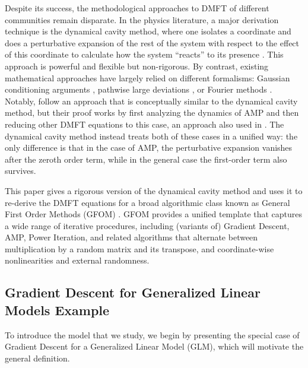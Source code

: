 \documentclass{article}
\newcommand{\1}{\mathbbm{1}}
\theoremstyle{plain}
\theoremstyle{definition}
\theoremstyle{remark}
\begin{document}
Despite its success, the methodological approaches to DMFT of different communities remain disparate. In the physics literature, a major derivation technique is the dynamical cavity method, where one isolates a coordinate and does a perturbative expansion of the rest of the system with respect to the effect of this coordinate to calculate how the system ``reacts'' to its presence \cite{mezard1987spin}. This approach is powerful and flexible but non-rigorous. By contrast, existing mathematical approaches have largely relied on different formalisms: Gaussian conditioning arguments \cite{bolthausen2014iterative, bayati2011dynamics, celentano2020estimation, celentano2021high, gerbelot2024rigorous}, pathwise large deviations \cite{arous1995large, arous1997symmetric, guionnet1997averaged, ben2006cugliandolo, grunwald1996sanov}, or Fourier methods \cite{bayati2015universality, jones2024fourier}. Notably, \cite{bao2025leave, han2025entrywise} follow an approach that is conceptually similar to the dynamical cavity method, but their proof works by first analyzing the dynamics of AMP and then reducing other DMFT equations to this case, an approach also used in \cite{celentano2020estimation, celentano2021high, dudeja2024spectral}. The dynamical cavity method instead
treats both of these cases in a unified way: the only difference is that in the case of AMP, the perturbative expansion vanishes after the zeroth order term, while in the general case the first-order term also survives.


This paper gives a rigorous version of the dynamical cavity method and uses it to re-derive the DMFT equations for a broad algorithmic class known as General First Order Methods (GFOM) \cite{celentano2020estimation}. GFOM provides a unified template that captures a wide range of iterative procedures, including (variants of) Gradient Descent, AMP, Power Iteration, and related algorithms that alternate between multiplication by a random matrix and its transpose, and coordinate-wise nonlinearities and external randomness.


\subsection{Gradient Descent for Generalized Linear Models Example}

To introduce the model that we study, we begin by presenting the special case of Gradient Descent for a Generalized Linear Model (GLM), which will motivate the general definition.
\end{document}
